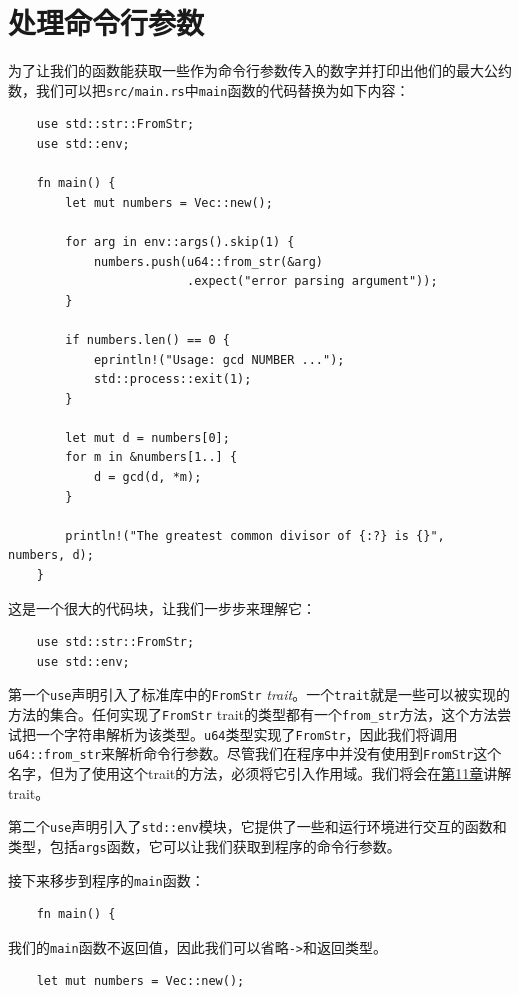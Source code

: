 \section{处理命令行参数}
为了让我们的函数能获取一些作为命令行参数传入的数字并打印出他们的最大公约数，我们可以把\texttt{src/main.rs}中\texttt{main}函数的代码替换为如下内容：
\begin{verbatim}
    use std::str::FromStr;
    use std::env;

    fn main() {
        let mut numbers = Vec::new();

        for arg in env::args().skip(1) {
            numbers.push(u64::from_str(&arg)
                         .expect("error parsing argument"));
        }

        if numbers.len() == 0 {
            eprintln!("Usage: gcd NUMBER ...");
            std::process::exit(1);
        }

        let mut d = numbers[0];
        for m in &numbers[1..] {
            d = gcd(d, *m);
        }

        println!("The greatest common divisor of {:?} is {}",   numbers, d);
    }
\end{verbatim}

这是一个很大的代码块，让我们一步步来理解它：
\begin{verbatim}
    use std::str::FromStr;
    use std::env;
\end{verbatim}

第一个\texttt{use}声明引入了标准库中的\texttt{FromStr} \emph{trait}。一个\texttt{trait}就是一些可以被实现的方法的集合。任何实现了\texttt{FromStr} trait的类型都有一个\texttt{from\_str}方法，这个方法尝试把一个字符串解析为该类型。\texttt{u64}类型实现了\texttt{FromStr}，因此我们将调用\texttt{u64::from\_str}来解析命令行参数。尽管我们在程序中并没有使用到\texttt{FromStr}这个名字，但为了使用这个trait的方法，必须将它引入作用域。我们将会在\hyperref[ch11]{第11章}讲解trait。

第二个\texttt{use}声明引入了\texttt{std::env}模块，它提供了一些和运行环境进行交互的函数和类型，包括\texttt{args}函数，它可以让我们获取到程序的命令行参数。

接下来移步到程序的\texttt{main}函数：
\begin{verbatim}
    fn main() {
\end{verbatim}

我们的\texttt{main}函数不返回值，因此我们可以省略\texttt{->}和返回类型。

\begin{verbatim}
    let mut numbers = Vec::new();
\end{verbatim}

